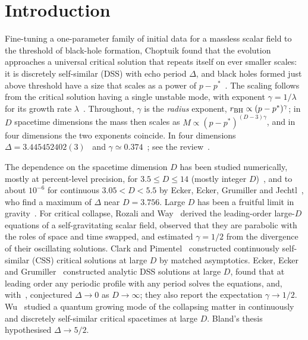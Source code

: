 \documentclass[aps,prd,onecolumn,superscriptaddress,nofootinbib,10pt]{revtex4-2}
\begin{document}
\tableofcontents

\section{Introduction}
\label{sec:intro}

Fine-tuning a one-parameter family of initial data for a massless scalar field to the threshold of black-hole formation,
Choptuik found that the evolution approaches a universal critical solution that repeats itself on ever smaller scales: it
is discretely self-similar (DSS) with echo period $\Delta$, and black holes formed just above threshold have a size that
scales as a power of $p - p^*$~\cite{Choptuik1993}. The scaling follows from the critical solution having a single
unstable mode, with exponent $\gamma = 1/\lambda$ for its growth rate $\lambda$~\cite{KoikeHaraAdachi1995}. Throughout,
$\gamma$ is the \emph{radius} exponent, $r_{\rm BH} \propto (p - p^*)^\gamma$; in $D$ spacetime dimensions the mass then
scales as $M \propto (p - p^*)^{(D-3)\gamma}$, and in four dimensions the two exponents coincide. In four dimensions
$\Delta = 3.445452402(3)$~\cite{MartinGarciaGundlach2003} and $\gamma \simeq 0.374$~\cite{Gundlach1997}; see the
review~\cite{GundlachReview2025}.

The dependence on the spacetime dimension $D$ has been studied numerically, mostly at percent-level precision, for
$3.5 \le D \le 14$ (mostly integer $D$)~\cite{GarfinkleCutlerDuncan1999,SorkinOren2005,BlandEtAl2005,BlandKunstatter2007,Bland2007,TavesKunstatter2011},
and to about $10^{-6}$ for continuous $3.05 < D < 5.5$ by Ecker, Ecker, Grumiller and Jechtl~\cite{EckerEtAl2026}, who
find a maximum of $\Delta$ near $D = 3.756$. Large $D$ has been a fruitful limit in gravity~\cite{EmparanHerzog2020}.
For critical collapse, Rozali and Way~\cite{RozaliWay2018} derived the leading-order large-$D$ equations of a
self-gravitating scalar field, observed that they are parabolic with the roles of space and time swapped, and estimated
$\gamma = 1/2$ from the divergence of their oscillating solutions. Clark and Pimentel~\cite{ClarkPimentel2025}
constructed continuously self-similar (CSS) critical solutions at large $D$ by matched asymptotics. Ecker, Ecker and
Grumiller~\cite{EckerEckerGrumiller2026} constructed analytic DSS solutions at large $D$, found that at leading order any
periodic profile with any period solves the equations, and, with~\cite{EckerEtAl2026}, conjectured $\Delta \to 0$ as
$D \to \infty$; they also report the expectation $\gamma \to 1/2$. Wu~\cite{Wu2026} studied a quantum growing mode of the
collapsing matter in continuously and discretely self-similar critical spacetimes at large $D$. Bland's
thesis~\cite{Bland2007} hypothesised
$\Delta \to 5/2$.
\end{document}
